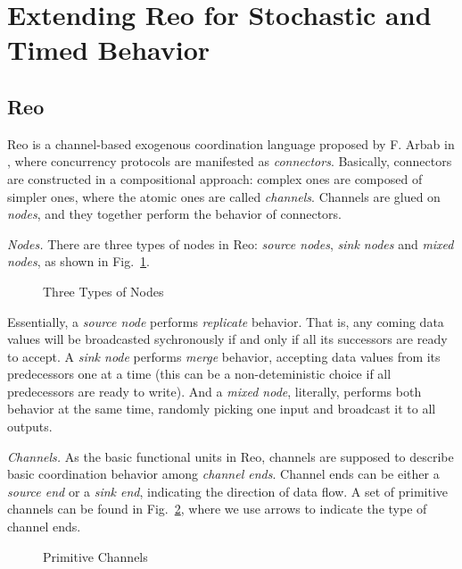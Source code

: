 \section{Extending Reo for Stochastic and Timed Behavior}
\label{sec:reo}

\subsection{Reo}

Reo is a channel-based exogenous coordination language proposed by F. Arbab in \cite{ARBAB2004}, where concurrency protocols are manifested as \emph{connectors}. Basically, connectors are constructed in a compositional approach: complex ones are composed of simpler ones, where the atomic ones are called \emph{channels}. Channels are glued on \emph{nodes}, and they together perform the behavior of connectors.

\vspace{.5em}

\noindent\emph{Nodes.} There are three types of nodes in Reo: \emph{source nodes}, \emph{sink nodes} and \emph{mixed nodes}, as shown in Fig.~\ref{fig:typeofnodes}.

\begin{figure}[H]
    \centering
    
    \caption{Three Types of Nodes}
    \label{fig:typeofnodes}
\end{figure}

Essentially, a \emph{source node} performs \emph{replicate} behavior. That is, any coming data values will be broadcasted sychronously if and only if all its successors are ready to accept. A \emph{sink node} performs \emph{merge} behavior, accepting data values from its predecessors one at a time (this can be a non-deteministic choice if all predecessors are ready to write). And a \emph{mixed node}, literally, performs both behavior at the same time, randomly picking one input and broadcast it to all outputs.

\vspace{.5em}
\noindent\emph{Channels.} As the basic functional units in Reo, channels are supposed to describe basic coordination behavior among \emph{channel ends}. Channel ends can be either a \emph{source end} or a \emph{sink end}, indicating the direction of data flow. A set of primitive channels can be found in Fig.~\ref{fig:basicchannels}, where we use arrows to indicate the type of channel ends.

\begin{figure}[H]
    \centering
    
    \caption{Primitive Channels}
    \label{fig:basicchannels}
\end{figure}

